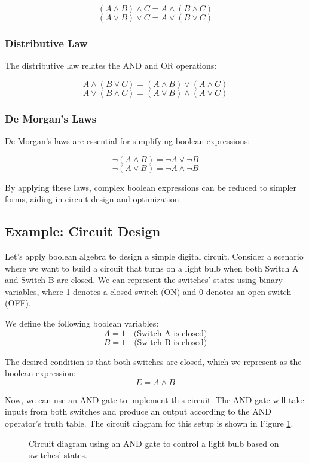 \documentclass{article}
\begin{document}
\[ (A \land B) \land C = A \land (B \land C) \]
\[ (A \lor B) \lor C = A \lor (B \lor C) \]

\subsubsection{Distributive Law}

The distributive law relates the AND and OR operations:

\[ A \land (B \lor C) = (A \land B) \lor (A \land C) \]
\[ A \lor (B \land C) = (A \lor B) \land (A \lor C) \]

\subsubsection{De Morgan's Laws}

De Morgan's laws are essential for simplifying boolean expressions:

\[ \lnot (A \land B) = \lnot A \lor \lnot B \]
\[ \lnot (A \lor B) = \lnot A \land \lnot B \]

By applying these laws, complex boolean expressions can be reduced to simpler forms, aiding in circuit design and optimization.

\subsection{Example: Circuit Design}

Let's apply boolean algebra to design a simple digital circuit. Consider a scenario where we want to build a circuit that turns on a light bulb when both Switch A and Switch B are closed. We can represent the switches' states using binary variables, where 1 denotes a closed switch (ON) and 0 denotes an open switch (OFF).

We define the following boolean variables:
\[ A = 1 \quad \text{(Switch A is closed)} \]
\[ B = 1 \quad \text{(Switch B is closed)} \]

The desired condition is that both switches are closed, which we represent as the boolean expression:
\[ E = A \land B \]

Now, we can use an AND gate to implement this circuit. The AND gate will take inputs from both switches and produce an output according to the AND operator's truth table. The circuit diagram for this setup is shown in Figure \ref{fig:and_gate_circuit}.

\begin{figure}[h]
  \centering
  \caption{Circuit diagram using an AND gate to control a light bulb based on switches' states.}
  \label{fig:and_gate_circuit}
\end{figure}
\end{document}
